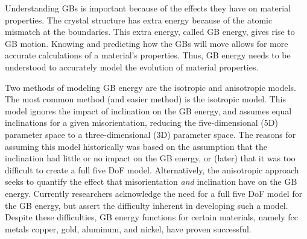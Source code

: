 \documentclass[twoside,senior]{BYUPhys}
\begin{document}
Understanding GBs is important because of the effects they have on material properties.\cite{patala2013, homer2015, bulatov2014}  The crystal structure has extra energy because of the atomic mismatch at the boundaries.  This extra energy, called GB energy, gives rise to GB motion.  Knowing and predicting how the GBs will move allows for more accurate calculations of a material's properties.  Thus, GB energy needs to be understood to accurately model the evolution of material properties.

Two methods of modeling GB energy are the isotropic and anisotropic models.  The most common method (and easier method) is the isotropic model.  This model ignores the impact of inclination on the GB energy, and assumes equal inclinations for a given misorientation, reducing the five-dimensional (5D) parameter space to a three-dimensional (3D) parameter space.  The reasons for assuming this model historically was based on the assumption that the inclination had little or no impact on the GB energy, or (later) that it was too difficult to create a full five DoF model.\cite{homer2015}  Alternatively, the anisotropic approach seeks to quantify the effect that misorientation \emph{and} inclination have on the GB energy.  Currently researchers acknowledge the need for a full five DoF model for the GB energy, but assert the difficulty inherent in developing such a model.\cite{rohrer2011, lejcek2010, homer2015}  Despite these difficulties, GB energy functions for certain materials, namely fcc metals copper, gold, aluminum, and nickel, have proven successful.\cite{bulatov2014}
\end{document}
